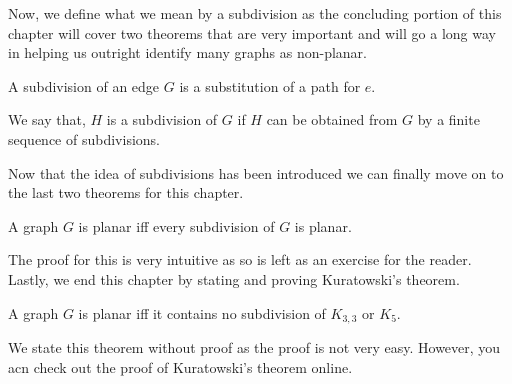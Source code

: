 \documentclass[../basic_graph_theory.tex]{subfiles}
\begin{document}
Now, we define what we mean by a subdivision as the concluding portion of this chapter will cover two theorems that are very important and will go a long way in helping us outright identify many graphs as non-planar.\\

\begin{Def}{}{}
    A subdivision of an edge $G$ is a substitution of a path for $e$.
\end{Def}
\begin{Def}{}{}
    We say that, $H$ is a subdivision of $G$ if $H$ can be obtained from $G$ by a finite sequence of subdivisions.
\end{Def}

Now that the idea of subdivisions has been introduced we can finally move on to the last two theorems for this chapter.
\begin{Thm}{}{}
    A graph $G$ is planar iff every subdivision of $G$ is planar.
\end{Thm}{}{}
The proof for this is very intuitive as so is left as an exercise for the reader.\\
Lastly, we end this chapter by stating and proving Kuratowski's theorem.\\
\begin{Thm}{}{}
    A graph $G$ is planar iff it contains no subdivision of $K_{3,3}$ or $K_{5}$.
\end{Thm}{}{}
We state this theorem without proof as the proof is not very easy. However, you acn check out the proof of Kuratowski's theorem online.
\end{document}
